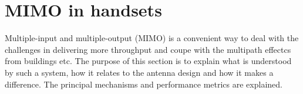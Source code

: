 \section{MIMO in handsets} %
\label{sec:mimo_in_handsets}
Multiple-input and multiple-output (MIMO) is a convenient way to deal with the challenges in delivering more throughput and coupe with the multipath effectcs from buildings etc. The purpose of this section is to explain what is understood by such a system, how it relates to the antenna design and how it makes a difference. The principal mechanisms and performance metrics are explained.





